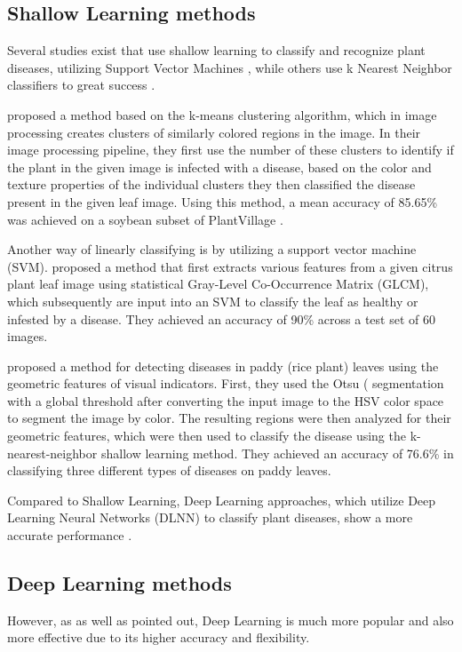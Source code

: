 \documentclass[draft,final]{vutinfth} %
\begin{document}
\subsection{Shallow Learning methods}
Several studies exist that use shallow learning to classify and recognize plant diseases, utilizing Support Vector Machines \cite{kirti_black_2020}, while others use k Nearest Neighbor classifiers to great success \cite{bharate_classification_2020}.

\cite{kaur_semi-automatic_2018} proposed a method based on the k-means clustering algorithm, which in image processing creates clusters of similarly colored regions in the image. In their image processing pipeline, they first use the number of these clusters to identify if the plant in the given image is infected with a disease, based on the color and texture properties of the individual clusters they then classified the disease present in the given leaf image. Using this method, a mean accuracy of 85.65\% was achieved on a soybean subset of PlantVillage \cite{hughes_open_2016}.

Another way of linearly classifying is by utilizing a support vector machine (SVM). \cite{prakash_detection_2017} proposed a method that first extracts various features from a given citrus plant leaf image using statistical Gray-Level Co-Occurrence Matrix (GLCM), which subsequently are input into an SVM to classify the leaf as healthy or infested by a disease. They achieved an accuracy of 90\% across a test set of 60 images. 

\cite{suresha_recognition_2017} proposed a method for detecting diseases in paddy (rice plant) leaves using the geometric features of visual indicators. First, they used the Otsu (\cite{otsu_threshold_1979} segmentation with a global threshold after converting the input image to the HSV color space to segment the image by color. The resulting regions were then analyzed for their geometric features, which were then used to classify the disease using the k-nearest-neighbor shallow learning method. They achieved an accuracy of 76.6\% in classifying three different types of diseases on paddy leaves.

Compared to Shallow Learning, Deep Learning approaches, which utilize Deep Learning Neural Networks (DLNN) to classify plant diseases, show a more accurate performance \cite{yao_machine_2023, sujatha_performance_2021}.

\subsection{Deep Learning methods}
However, as \cite{yao_machine_2023} as well as \cite{sujatha_performance_2021} pointed out, Deep Learning is much more popular and also more effective due to its higher accuracy and flexibility.
\end{document}
